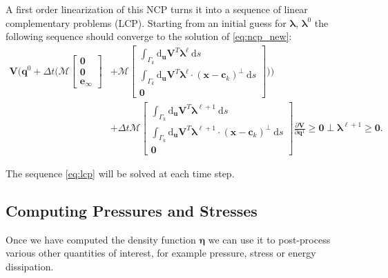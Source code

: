 \documentclass[preprint, 10pt]{elsarticle}
\begin{document}
A first order linearization of this NCP turns it into a sequence of linear
complementary problems (LCP). Starting from an initial guess for
$\pmb{\lambda}$, $\pmb{\lambda}^0$ the following sequence should converge to the solution of \eqref{eq:ncp_new}:
\begin{equation}\label{eq:lcp}\begin{aligned}
\mathbf{V}\biggl(\mathbf{q}^0 + \Delta
t\biggl(\mathcal{M}\begin{bmatrix}\mathbf{0}\\\mathbf{0}\\\mathbf{e}_\infty\end{bmatrix}
&+ \mathcal{M}\begin{bmatrix} \int_{\Gamma_k}
\text{d}_\mathbf{u}\mathbf{V}^T\pmb{\lambda}^\ell~\text{d}s\\ \int_{\Gamma_k}
\text{d}_\mathbf{u}\mathbf{V}^T\pmb{\lambda}^\ell\cdot(\mathbf{x}-\mathbf{c}_k)^\perp~\text{d}s
\\\mathbf{0}\end{bmatrix}\biggr)\biggr) \\
&+ \Delta t \mathcal{M}\begin{bmatrix}\int_{\Gamma_k}
\text{d}_\mathbf{u}\mathbf{V}^T\pmb{\lambda}^{\ell+1}~\text{d}s\\
\int_{\Gamma_k}
\text{d}_\mathbf{u}\mathbf{V}^T\pmb{\lambda}^{\ell+1}\cdot(\mathbf{x}-\mathbf{c}_k)^\perp~\text{d}s
\\\mathbf{0}\end{bmatrix}\frac{\partial\mathbf{V}}{\partial \mathbf{q}^1} \geq
\mathbf{0} \perp \pmb{\lambda}^{\ell+1} \geq
\mathbf{0}.\end{aligned}\end{equation}

The sequence \eqref{eq:lcp} will be solved at each time step. 

\subsection{Computing Pressures and Stresses}

Once we have computed the density function $\pmb{\eta}$ we can use it to post-process various other quantities of interest, for example pressure, stress or energy dissipation. 
\end{document}
